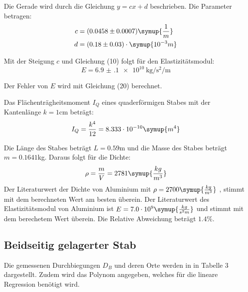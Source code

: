 Die Gerade wird durch die Gleichung $y = cx + d$ beschrieben. Die Parameter betragen:
\begin{align*}
  c &= (0.0458 \pm 0.0007) \symup{\frac{1}{m}} \\
  d &= (0.18  \pm 0.03)   \cdot \symup{10^{-3}m}
\end{align*}


Mit der Steigung $c$ und Gleichung (10) folgt für den Elastizitätsmodul:
\begin{equation}
  E = \SI{6.9(1)e10}{\kilo\gram\per\second\squared\per\meter}
\end{equation}

Der Fehler von $E$ wird mit Gleichung (20) berechnet.

Das Flächenträgheitsmoment $I_Q$ eines quaderförmigen Stabes mit der Kantenlänge
$k = 1$cm beträgt:
\begin{equation}
  I_Q = \frac{k^4}{12} = 8.333 \cdot 10^{-10} \symup{m^4}
\end{equation}


Die Länge des Stabes beträgt $L = 0.59$m und die Masse des Stabes beträgt $m = 0.1641$kg.
Daraus folgt für die Dichte:
\begin{equation}
  \rho = \frac{m}{V} = 2781 \symup{\frac{kg}{m^3}}
\end{equation}
Der Literaturwert der Dichte von Aluminium mit $\rho = 2700 \symup{\frac{kg}{m^3}}$ \cite{sample4},
stimmt mit dem berechneten Wert am besten überein. Der Literaturwert des Elastizitätsmodul
von Aluminium ist $E = 7.0 \cdot 10^{9} \symup{\frac{kg}{s^2m}}$ \cite{sample3} und stimmt mit dem berechetem Wert
überein. Die Relative Abweichung beträgt $1.4 \%$.

\subsection{Beidseitig gelagerter Stab}
Die gemessenen Durchbiegungen $D_{B}$ und deren Orte werden in in Tabelle 3 dargestellt. Zudem wird
das Polynom angegeben, welches für die lineare Regression benötigt wird.

